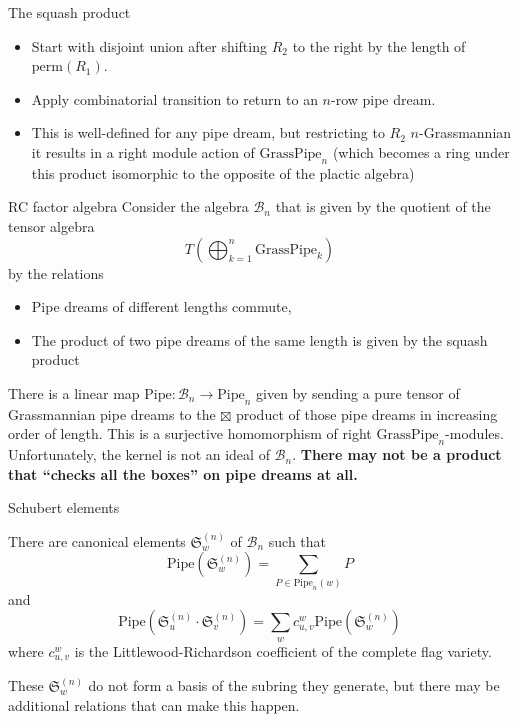 \documentclass[aspectratio=169]{beamer}
\newcommand{\sch}{\mathfrak{S}}
\newcommand{\RC}{\mathrm{Pipe}}
\begin{document}
\begin{frame}{The squash product}
  \vspace{0.45em}
  \begin{itemize}
    \item Start with disjoint union after shifting $R_2$ to the right by the length of $\mathrm{perm}(R_1)$.
    \item Apply combinatorial transition to return to an $n$-row pipe dream.
    \item This is well-defined for any pipe dream, but restricting to $R_2$ $n$-Grassmannian it results in a right module action of $\mathrm{GrassPipe}_n$ (which becomes a ring under this product isomorphic to the opposite of the plactic algebra)
  \end{itemize}
\end{frame}


\begin{frame}{RC factor algebra}
  Consider the algebra $\mathcal{B}_n$ that is given by the quotient of the tensor algebra 
  $$T\left(\bigoplus_{k=1}^n \mathrm{GrassPipe}_k\right)$$
  by the relations
  \begin{itemize}
  \item Pipe dreams of different lengths commute,
  \item The product of two pipe dreams of the same length is given by the squash product
  \end{itemize}
  There is a linear map $\RC:\mathcal{B}_n\to\RC_n$ given by sending a pure tensor of Grassmannian pipe dreams to the $\boxtimes$ product of those pipe dreams in increasing order of length.  This is a surjective homomorphism of right $\mathrm{GrassPipe}_n$-modules. Unfortunately, the kernel is not an ideal of $\mathcal{B}_n$. \textbf{There may not be a product that ``checks all the boxes'' on pipe dreams at all.}
\end{frame}

\newtheorem{conjecture}{Conjecture}

\begin{frame}{Schubert elements}
  \begin{theorem}[S, $2026+$]
  There are canonical elements $\sch_w^{(n)}$ of $\mathcal{B}_n$ such that 
  $$\RC(\sch_w^{(n)}) = \sum_{P\in \RC_n(w)}P$$
  and
  $$\RC(\sch_u^{(n)}\cdot \sch_v^{(n)}) = \sum_{w} c_{u,v}^{w}\RC(\sch_w^{(n)})$$
   where $c_{u,v}^{w}$ is the Littlewood-Richardson coefficient of the complete flag variety.
  \end{theorem}

  These $\sch_w^{(n)}$ do not form a basis of the subring they generate, but there may be additional relations that can make this happen.
\end{frame}
\end{document}
